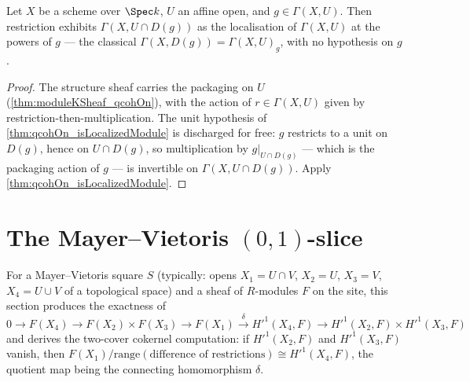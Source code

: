 \begin{theorem}
  \label{thm:qcohOn_isLocalizedModule_moduleKSheaf}
  \leanok
  Let \(X\) be a scheme over \(\Spec k\), \(U\) an affine open, and \(g \in \Gamma(X, U)\).
  Then restriction exhibits \(\Gamma(X, U \cap D(g))\) as the localisation of
  \(\Gamma(X, U)\) at the powers of \(g\) --- the classical
  \(\Gamma(X, D(g)) = \Gamma(X, U)_g\), with no hypothesis on \(g\).
\end{theorem}
\begin{proof}
  \leanok
  The structure sheaf carries the packaging on \(U\) (\ref{thm:moduleKSheaf_qcohOn}), with
  the action of \(r \in \Gamma(X, U)\) given by restriction-then-multiplication. The unit
  hypothesis of \ref{thm:qcohOn_isLocalizedModule} is discharged for free: \(g\) restricts
  to a unit on \(D(g)\), hence on \(U \cap D(g)\), so multiplication by
  \(g|_{U \cap D(g)}\) --- which is the packaging action of \(g\) --- is invertible on
  \(\Gamma(X, U \cap D(g))\). Apply \ref{thm:qcohOn_isLocalizedModule}.
\end{proof}

\section{The Mayer--Vietoris \((0,1)\)-slice}
\label{sec:mv-in-text}

For a Mayer--Vietoris square \(S\) (typically: opens \(X_1 = U \cap V\), \(X_2 = U\),
\(X_3 = V\), \(X_4 = U \cup V\) of a topological space) and a sheaf of \(R\)-modules \(F\) on
the site, this section produces the exactness of
\[
  0 \to F(X_4) \to F(X_2) \times F(X_3) \to F(X_1)
    \xrightarrow{\;\delta\;} H'^1(X_4, F) \to H'^1(X_2, F) \times H'^1(X_3, F)
\]
and derives the two-cover cokernel computation: if \(H'^1(X_2, F)\) and \(H'^1(X_3, F)\)
vanish, then \(F(X_1)/\mathrm{range}(\text{difference of restrictions}) \cong H'^1(X_4, F)\),
the quotient map being the connecting homomorphism \(\delta\).

